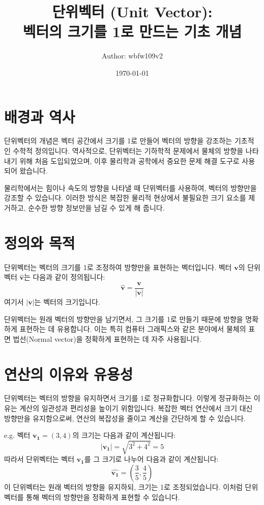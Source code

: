 \documentclass[12pt]{article}
\title{
    단위벡터 (Unit Vector): \\
    벡터의 크기를 1로 만드는 기초 개념
}
\author{Author: wbfw109v2}
\date{\today}
\begin{document}
\maketitle
\tableofcontents

\section{배경과 역사}

\noindent 단위벡터의 개념은 벡터 공간에서 크기를 1로 만들어 벡터의 방향을 강조하는 기초적인 수학적 정의입니다. 역사적으로, 단위벡터는 기하학적 문제에서 물체의 방향을 나타내기 위해 처음 도입되었으며, 이후 물리학과 공학에서 중요한 문제 해결 도구로 사용되어 왔습니다.

\vspace{1\baselineskip}
\noindent 물리학에서는 힘이나 속도의 방향을 나타낼 때 단위벡터를 사용하여, 벡터의 방향만을 강조할 수 있습니다. 이러한 방식은 복잡한 물리적 현상에서 불필요한 크기 요소를 제거하고, 순수한 방향 정보만을 남길 수 있게 해 줍니다.


\section{정의와 목적}

\noindent 단위벡터는 벡터의 크기를 1로 조정하여 방향만을 표현하는 벡터입니다. 벡터 \( \mathbf{v} \)의 단위벡터 \( \hat{\mathbf{v}} \)는 다음과 같이 정의됩니다:
\[
  \hat{\mathbf{v}} = \frac{\mathbf{v}}{|\mathbf{v}|}
\]
여기서 \( |\mathbf{v}| \)는 벡터의 크기입니다.

\noindent 단위벡터는 원래 벡터의 방향만을 남기면서, 그 크기를 1로 만들기 때문에 방향을 명확하게 표현하는 데 유용합니다. 이는 특히 컴퓨터 그래픽스와 같은 분야에서 물체의 표면 법선(Normal vector)을 정확하게 표현하는 데 자주 사용됩니다.


\section{연산의 이유와 유용성}

\noindent 단위벡터는 벡터의 방향을 유지하면서 크기를 1로 정규화합니다. 이렇게 정규화하는 이유는 계산의 일관성과 편리성을 높이기 위함입니다. 복잡한 벡터 연산에서 크기 대신 방향만을 유지함으로써, 연산의 복잡성을 줄이고 계산을 간단하게 할 수 있습니다.

\vspace{1\baselineskip}
\noindent {} e.g. 벡터 \( \mathbf{v_1} = (3, 4) \)의 크기는 다음과 같이 계산됩니다:
\[
  |\mathbf{v_1}| = \sqrt{3^2 + 4^2} = 5
\]
따라서 단위벡터는 벡터 \( \mathbf{v_1} \)를 그 크기로 나누어 다음과 같이 계산됩니다:
\[
  \hat{\mathbf{v_1}} = \left( \frac{3}{5}, \frac{4}{5} \right)
\]
이 단위벡터는 원래 벡터의 방향을 유지하되, 크기는 1로 조정되었습니다. 이처럼 단위벡터를 통해 벡터의 방향만을 정확하게 표현할 수 있습니다.
\end{document}
